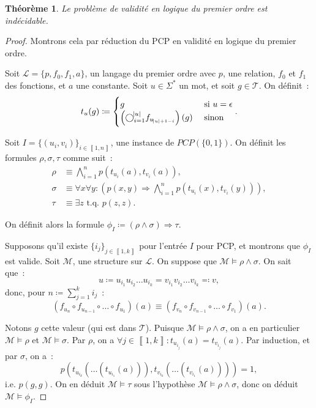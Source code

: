 \documentclass{article}
\newtheorem{thm}{Théorème}[section]
\theoremstyle{definition}
\theoremstyle{remark}
\newcommand{\intint}[2]{\left\llbracket#1, #2\right\rrbracket}
\newcommand{\tq}{\text{ t.q. }}
\begin{document}
		\begin{thm} Le problème de validité en logique du premier ordre est indécidable.
		\end{thm}

		\begin{proof} Montrons cela par réduction du PCP en validité en logique du premier ordre.

		Soit $\mathcal L = \{p, f_0, f_1, a\}$, un langage du premier ordre avec $p$, une relation, $f_0$ et $f_1$ des fonctions, et $a$ une constante.
		Soit $u \in \Sigma^*$ un mot, et soit $g \in \mathcal T$. On définit~:
		\[t_u(g) \coloneqq \begin{cases}g &\text{ si } u=\epsilon\\\left(\bigcirc_{i=1}^{\abs u}f_{u_{\abs u+1-i}}\right)(g) &\text{ sinon}\end{cases}.\]

		Soit $I = \{(u_i, v_i)\}_{i \in \intint 1n}$, une instance de $PCP(\{0, 1\})$. On définit les formules $\rho, \sigma, \tau$ comme suit~:
		\begin{align*}
			\rho &\equiv \bigwedge_{i=1}^np(t_{u_i}(a), t_{v_i}(a)), \\
			\sigma &\equiv \forall x \forall y : \left(p(x, y) \Rightarrow \bigwedge_{i=1}^np(t_{u_i}(x), t_{v_i}(y))\right), \\
			\tau &\equiv \exists z \tq p(z, z).
		\end{align*}

		On définit alors la formule $\phi_I \coloneqq (\rho \land \sigma) \Rightarrow \tau$.

		Supposons qu'il existe $\{i_j\}_{j \in \intint 1k}$ pour l'entrée $I$ pour PCP, et montrons que $\phi_I$ est valide. Soit $\mathcal M$, une structure sur
		$\mathcal L$. On suppose que $\mathcal M \models \rho \land \sigma$. On sait que~:
		\[u \coloneqq u_{i_1}u_{i_2}\ldots u_{i_k} = v_{i_1}v_{i_2}\ldots v_{i_k} \eqqcolon v,\]
		donc, pour $n \coloneqq \sum_{j=1}^ki_j$~:
		\[\left(f_{u_n} \circ f_{u_{n-1}} \circ \ldots \circ f_{u_1}\right)(a) \equiv \left(f_{v_n} \circ f_{v_{n-1}} \circ \ldots \circ f_{v_1}\right)(a).\]

		Notons $g$ cette valeur (qui est dans $\mathcal T$). Puisque $\mathcal M \models \rho \land \sigma$, on a en particulier $\mathcal M \models \rho$
		et $\mathcal M \models \sigma$. Par $\rho$, on a $\forall j \in \intint 1k : t_{u_{i_j}}(a) = t_{v_{i_j}}(a)$. Par induction, et par $\sigma$, on a~:
		\[p\left(t_{u_{i_k}}( \ldots(t_{u_{i_1}}(a))), t_{v_{i_k}}(\ldots(t_{v_{i_1}}(a)))\right) = 1,\]
		i.e. $p(g, g)$. On en déduit $\mathcal M \models \tau$ sous l'hypothèse $\mathcal M \models \rho \land \sigma$, donc on déduit $\mathcal M \models \phi_I$.


\end{proof}
\end{document}
